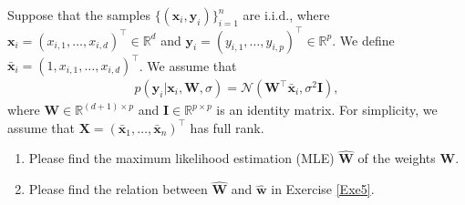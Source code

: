 \documentclass[11pt,letter,notitlepage]{article}
\begin{document}
\begin{exercise}
Suppose that the samples $\{(\mathbf{x}_i,\mathbf{y}_i)\}^n_{i=1}$ are i.i.d., where $\mathbf{x}_i =(x_{i,1}, \dots, x_{i,d})^{\top} \in \mathbb{R}^{d}$  and $\mathbf{y}_i = (y_{i,1}, \dots, y_{i,p})^{\top} \in \mathbb{R}^{p}$. We define $\bar{\mathbf{x}}_i = (1 , x_{i,1} ,\dots , x_{i,d})^{\top} $.  We assume that 
\begin{align*}
    p(\mathbf{y}_i|\mathbf{x}_i, \mathbf{W}, \sigma ) = \mathcal{N} ( \mathbf{W}^{\top} \bar{\mathbf{x}}_i  , \sigma^2 \mathbf{I}),
\end{align*}
where $\mathbf{W} \in \mathbb{R}^{(d+1) \times p}$ and $\mathbf{I} \in \mathbb{R}^{p \times p}$ is an identity matrix.
For simplicity, we assume that $\mathbf{X} = (\bar{\mathbf{x}}_1 , \dots, \bar{\mathbf{x}}_n)^{\top}$ has full rank.

\begin{enumerate}
    \item Please find the maximum likelihood estimation (MLE) $\hat{\mathbf{W}}$ of the weights $\mathbf{W}$. 
    \item Please find the relation between $\hat{\mathbf{W}}$ and $\hat{\mathbf{w}}$ in Exercise \ref{Exe5}.
\end{enumerate}
\end{exercise}
\begin{solution}
    
\end{solution}





    




\end{document}
